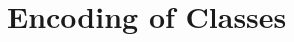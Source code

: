 \documentclass[workingdraft]{usetex-v1}
\begin{document}


\section{Encoding of Classes}
\label{sec:encoding-classes}
\end{document}
